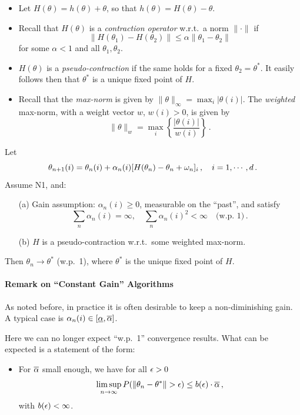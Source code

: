 \begin{itemize}
\item
Let $H(\theta) = h(\theta) + \theta$, so that $h(\theta) = H(\theta) - \theta$.
\item
Recall that $H(\theta)$ is a {\em contraction operator} w.r.t.\ a norm
$\|\cdot\|$ if
$$
\| H(\theta_1) - H(\theta_2)\| \le \alpha \| \theta_1 - \theta_2\|
$$
for some $\alpha < 1$ and all $\theta_1, \theta_2$.
\item
$H(\theta)$ is a {\em pseudo-contraction} if the same holds for a
fixed $\theta_2=\theta^*$.
It easily follows then that $\theta^*$ is a unique fixed point of $H$.
\item
Recall that the {\em max-norm} is given by
$\|\theta\|_\infty = \max_i |\theta(i)|$.
The {\em weighted} max-norm, with a weight vector $w$, $w(i) > 0$, is given by
$$
\|\theta\|_w = \max_i \left\{ \frac{|\theta(i)|}{w(i)}\right\} 
\,.
$$
\end{itemize}

\begin{theorem}[Prop. 4.4. in B.\&T.]\label{thm:SA_2}
Let
$$
\theta_{n+1}(i) = \theta_n(i) + \alpha_n (i)  [H(\theta_n) - \theta_n +
\omega_n]_i\,, \quad i=1, \cdots, d\,.
$$
Assume N1, and:
\begin{itemize}
\item[(a)]
Gain assumption: $\alpha_n(i) \ge 0$, measurable on the ``past'', and satisfy
$$
\sum_n \alpha_n(i) = \infty, \quad \sum_n \alpha_n(i)^2 < \infty \quad
\text{(w.p. 1)}\,.
$$
\item[(b)]
$H$ is a pseudo-contraction w.r.t.\ some weighted max-norm.
\end{itemize}
Then $\theta_n \to \theta^*$ (w.p.\  1), where $\theta^*$ is the unique fixed point
of $H$.
\end{theorem}



\paragraph{Remark on ``Constant Gain'' Algorithms}

As noted before, in practice it is often desirable to keep a non-diminishing
gain.
A typical case is $ \alpha_n(i)\in [\underline\alpha, \overline{\alpha}]$.

Here we can no longer expect ``w.p.\   1'' convergence results.  What can be
expected is a statement of the form:
\begin{itemize}
\item
For $\overline\alpha$ small enough, we have for all $\epsilon > 0$
$$
\limsup_{n \to \infty} P (\|\theta_n - \theta^* \| > \epsilon) \le b(\epsilon) \cdot
\overline\alpha\,,
$$
with $b(\epsilon) < \infty$.
\end{itemize}

